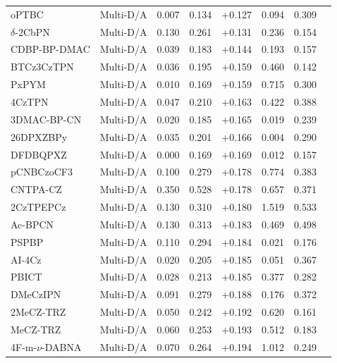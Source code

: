 \begin{longtable}{llcccccc}
oPTBC & Multi-D/A & 0.007 & 0.134 & +0.127 & 0.094 & 0.309 & \cite{doi101016jdyepig201704024} \\
$\delta$-2CbPN & Multi-D/A & 0.130 & 0.261 & +0.131 & 0.236 & 0.154 & \cite{doi101039C6MH00579A} \\
CDBP-BP-DMAC & Multi-D/A & 0.039 & 0.183 & +0.144 & 0.193 & 0.157 & \cite{doi101039D1QM01625C} \\
BTCz3CzTPN & Multi-D/A & 0.036 & 0.195 & +0.159 & 0.460 & 0.142 & \cite{doi101039D1TC04875A} \\
PxPYM & Multi-D/A & 0.010 & 0.169 & +0.159 & 0.715 & 0.300 & \cite{doi101039D0RA07865D} \\
4CzTPN & Multi-D/A & 0.047 & 0.210 & +0.163 & 0.422 & 0.388 & \cite{doi101039C8CC03425G} \\
3DMAC-BP-CN & Multi-D/A & 0.020 & 0.185 & +0.165 & 0.019 & 0.239 & \cite{doi101016jdyepig2021109731} \\
26DPXZBPy & Multi-D/A & 0.035 & 0.201 & +0.166 & 0.004 & 0.290 & \cite{doi101039C9TC04536H} \\
DFDBQPXZ & Multi-D/A & 0.000 & 0.169 & +0.169 & 0.012 & 0.157 & \cite{doi101039C7CC09925H} \\
pCNBCzoCF3 & Multi-D/A & 0.100 & 0.279 & +0.178 & 0.774 & 0.383 & \cite{doi101039C7TC05392D} \\
CNTPA-CZ & Multi-D/A & 0.350 & 0.528 & +0.178 & 0.657 & 0.371 & \cite{doi101016jdyepig201810076} \\
2CzTPEPCz & Multi-D/A & 0.130 & 0.310 & +0.180 & 1.519 & 0.533 & \cite{doi101039C8TC01210E} \\
Ac-BPCN & Multi-D/A & 0.130 & 0.313 & +0.183 & 0.469 & 0.498 & \cite{doi101039D0TC00960A} \\
PSPBP & Multi-D/A & 0.110 & 0.294 & +0.184 & 0.021 & 0.176 & \cite{doi101016jcplett2021138474} \\
AI-4Cz & Multi-D/A & 0.020 & 0.205 & +0.185 & 0.051 & 0.367 & \cite{doi101016jorgel2020106017} \\
PBICT & Multi-D/A & 0.028 & 0.213 & +0.185 & 0.377 & 0.282 & \cite{doi101039D0TC04465B} \\
DMeCzIPN & Multi-D/A & 0.091 & 0.279 & +0.188 & 0.176 & 0.372 & \cite{doi101016jcej2021128574} \\
2MeCZ-TRZ & Multi-D/A & 0.050 & 0.242 & +0.192 & 0.620 & 0.161 & \cite{doi101016jorgel2020105783} \\
MeCZ-TRZ & Multi-D/A & 0.060 & 0.253 & +0.193 & 0.512 & 0.183 & \cite{doi101016jorgel2020105783} \\
4F-m-$\nu$-DABNA & Multi-D/A & 0.070 & 0.264 & +0.194 & 1.012 & 0.249 & \cite{doi101016jcej2021134381} \\

\end{longtable}
